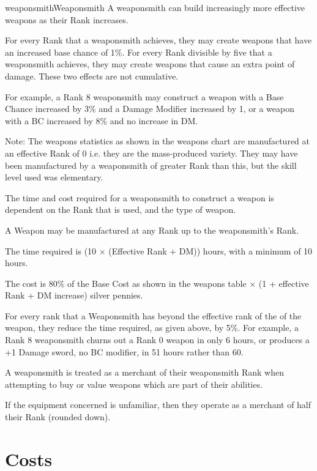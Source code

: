 \begin{Skill}[1.1]{weaponsmith}{Weaponsmith}
A weaponsmith can build increasingly more effective weapons as their
Rank increases.

For every Rank that a weaponsmith achieves, they may create weapons
that have an increased base chance of 1\%.  For every Rank divisible
by five that a weaponsmith achieves, they may create weapons that
cause an extra point of damage.  These two effects are not cumulative.

For example, a Rank 8 weaponsmith may construct a weapon with a Base
Chance increased by 3\% and a Damage Modifier increased by 1, or a
weapon with a BC increased by 8\% and no increase in DM.

Note: The weapons statistics as shown in the weapons chart are
manufactured at an effective Rank of 0 i.e. they are the mass-produced
variety.  They may have been manufactured by a weaponsmith of greater
Rank than this, but the skill level used was elementary.

The time and cost required for a weaponsmith to construct a weapon is
dependent on the Rank that is used, and the type of weapon.

A Weapon may be manufactured at any Rank up to the weaponsmith’s Rank.

\begin{Enumerate}

\item The time required is (10 × (Effective Rank + DM)) hours, with a
  minimum of 10 hours.

\item The cost is 80\% of the Base Cost as shown in the weapons table
  × (1 + effective Rank + DM increase) silver pennies.

\item For every rank that a Weaponsmith has beyond the effective rank
  of the of the weapon, they reduce the time required, as given above,
  by 5\%.  For example, a Rank 8 weaponsmith churns out a Rank 0
  weapon in only 6 hours, or produces a +1 Damage sword, no BC
  modifier, in 51 hours rather than 60.

\end{Enumerate}

A weaponsmith is treated as a merchant of their weaponsmith Rank when
attempting to buy or value weapons which are part of their abilities.

If the equipment concerned is unfamiliar, then they operate as a
merchant of half their Rank (rounded down).

\section{Costs}


\end{Skill}
